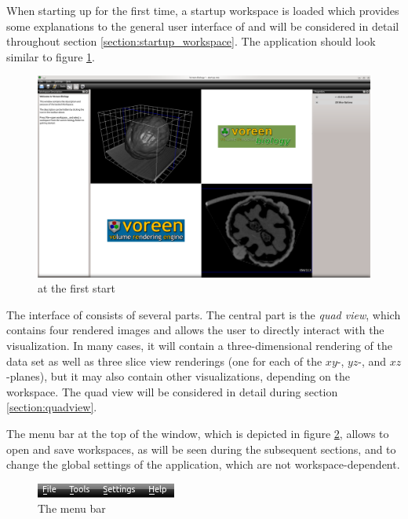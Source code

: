 When starting up \Voreen for the first time, a startup workspace is loaded which provides some explanations to the general user interface 
of \Voreen and will be considered in detail throughout section \ref{section:startup_workspace}. The application should look similar to 
figure \ref{fig:vb_complete_interface}.

\begin{figure}[htb]
 \centering
 \includegraphics[scale=0.337,keepaspectratio=true]{./images/voreen_biology_complete_interface.png}
 \caption{\Voreen at the first start}
 \label{fig:vb_complete_interface}
\end{figure}

The interface of \Voreen consists of several parts. The central part is the \emph{quad view}, which contains four rendered images and allows the user 
to directly interact with the visualization. In many cases, it
will contain a three-dimensional rendering of the data set as well as three slice view renderings (one for each of the $xy$-, $yz$-, and $xz$-planes),
but it may also contain other visualizations, depending on the workspace. The quad view will be considered in detail during section \ref{section:quadview}.

The menu bar at the top of the \Voreen window, which is depicted in figure \ref{fig:menu_bar}, allows to open and save workspaces, 
as will be seen during the subsequent sections, and to change 
the global settings of the application, which are not workspace-dependent.

\begin{figure}[htb]
 \centering
 \includegraphics[scale=1.1,keepaspectratio=true]{./images/menu_bar.png}
 \caption{The \Voreen menu bar}
 \label{fig:menu_bar}
\end{figure}

